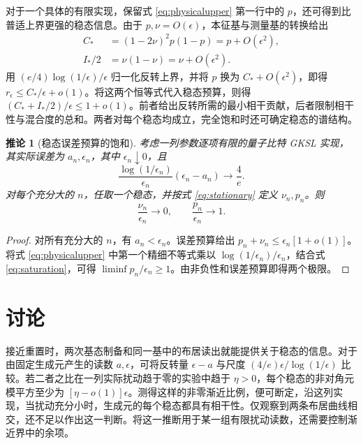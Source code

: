 \documentclass[aps,pra,reprint,amsmath,amssymb,nofootinbib,floatfix,longbibliography]{revtex4-2}
\theoremstyle{aps}
\newtheorem{corollary}[theorem]{推论}
\newcommand{\eps}{\epsilon}
\begin{document}
对于一个具体的有限实现，保留式 \eqref{eq:physicalupper} 第一行中的 $p$，还可得到比普适上界更强的稳态信息。由于 $p,\nu=O(\eps)$，本征基与测量基的转换给出
\[
 \begin{aligned}
 C_*&=(1-2\nu)^2p(1-p)=p+O(\eps^2),\\
 I_*/2&=\nu(1-\nu)=\nu+O(\eps^2).
 \end{aligned}
\]
用 $(e/4)\log(1/\eps)/\eps$ 归一化反转上界，并将 $p$ 换为 $C_*+O(\eps^2)$，即得 $r_\eps\le C_*/\eps+o(1)$。将这两个恒等式代入稳态预算，则得 $(C_*+I_*/2)/\eps\le1+o(1)$。前者给出反转所需的最小相干贡献，后者限制相干性与混合度的总和。两者对每个稳态均成立，完全饱和时还可确定稳态的谱结构。

\begin{corollary}[稳态误差预算的饱和]\label{cor:saturation}
考虑一列参数逐项有限的量子比特 GKSL 实现，其实际误差为 $a_n,\eps_n$，其中 $\eps_n\downarrow0$，且
\begin{equation}\label{eq:saturation}
 \frac{\log(1/\eps_n)}{\eps_n}(\eps_n-a_n)\longrightarrow\frac4e.
\end{equation}
对每个充分大的 $n$，任取一个稳态，并按式 \eqref{eq:stationary} 定义 $\nu_n,p_n$。则
\begin{equation}\label{eq:rigidity}
 \frac{\nu_n}{\eps_n}\longrightarrow0,
 \qquad\frac{p_n}{\eps_n}\longrightarrow1.
\end{equation}
\end{corollary}

\begin{proof}
对所有充分大的 $n$，有 $a_n<\eps_n$。误差预算给出
$p_n+\nu_n\le\eps_n[1+o(1)]$。将式 \eqref{eq:physicalupper} 中第一个精细不等式乘以 $\log(1/\eps_n)/\eps_n$，结合式 \eqref{eq:saturation}，可得 $\liminf p_n/\eps_n\ge1$。由非负性和误差预算即得两个极限。
\end{proof}

\section{讨论}\label{sec:discussion}

接近重置时，两次基态制备和同一基中的布居读出就能提供关于稳态的信息。对于由固定生成元产生的读数 $a,\eps$，可将反转量 $\eps-a$ 与尺度 $(4/e)\eps/\log(1/\eps)$ 比较。若二者之比在一列实际扰动趋于零的实验中趋于 $\eta>0$，每个稳态的非对角元模平方至少为 $[\eta-o(1)]\eps$。测得这样的非零渐近比例，便可断定，沿这列实现，当扰动充分小时，生成元的每个稳态都具有相干性。仅观察到两条布居曲线相交，还不足以作出这一判断。将这一推断用于某一组有限扰动读数，还需要控制渐近界中的余项。
\end{document}
